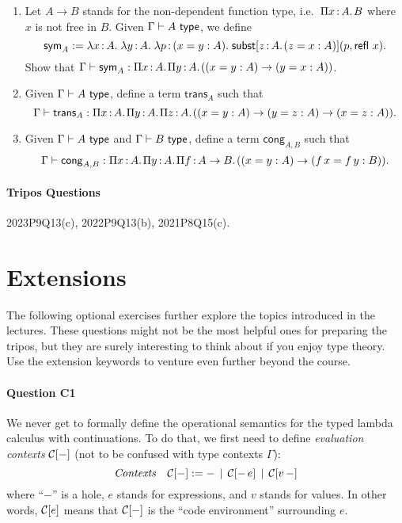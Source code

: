 \documentclass[11pt,a4paper,twoside]{article}
\begin{document}
\begin{enumerate}[label=(\alph*)]
  \item Let $A \to B$ stands for the non-dependent function type, i.e.~$\Pi x \,{:}\, A .\;\! B$ where $x$ is not free in $B$.
  Given $\Gamma \vdash A\ \mathsf{type}$, we define
  \[
    \mathsf{sym}_A := 
    \lambda x \,{:}\, A .\; 
      \lambda y \,{:}\, A .\; 
        \lambda p \,{:}\, (x = y : A) .\; 
          \mathsf{subst}[z \,{:}\, A .\;\! (z = x : A)](p, \mathsf{refl}\ x)
       .
  \]
  Show that $\Gamma \vdash \mathsf{sym}_A : \Pi x \,{:}\, A .\;\! \Pi y \,{:}\, A .\;\! ((x = y : A) \to (y = x : A))$.

  \item Given $\Gamma \vdash A\ \mathsf{type}$, define a term $\mathsf{trans}_A$ such that
  \[
    \Gamma \vdash \mathsf{trans}_A : 
      \Pi x \,{:}\, A .\;\! \Pi y \,{:}\, A .\;\! \Pi z \,{:}\, A .\;\! 
        ((x = y : A) \to (y = z : A) \to (x = z : A))
     .
  \]

  \item Given $\Gamma \vdash A\ \mathsf{type}$ and $\Gamma \vdash B\ \mathsf{type}$, define a term $\mathsf{cong}_{A,B}$ such that
  \[
    \Gamma \vdash \mathsf{cong}_{A, B} : 
      \Pi x \,{:}\, A .\;\! \Pi y \,{:}\, A .\;\! \Pi f \,{:}\, A \to B .\;\! 
        ((x = y : A) \to (f \, x = f \, y : B))
     .
  \]
\end{enumerate}

\paragraph{Tripos Questions} 2023P9Q13(c), 2022P9Q13(b), 2021P8Q15(c).

\section*{Extensions}

The following optional exercises further explore the topics introduced in the lectures. These questions might not be the most helpful ones for preparing the tripos, but they are surely interesting to think about if you enjoy type theory. Use the extension keywords to venture even further beyond the course.

\paragraph{Question C1}
We never get to formally define the operational semantics
for the typed lambda calculus with continuations.
To do that, we first need to define \emph{evaluation contexts} $\mathcal{C}[-]$
 (not to be confused with type contexts $\Gamma$):
\[ 
  \mathit{Contexts}\quad \mathcal{C}[-] := - \,\mid\, \mathcal{C}[- \, e] \,\mid\, \mathcal{C}[v \, -]
\]
where ``$-$'' is a hole, $e$ stands for expressions, and $v$ stands for values.
In other words, $\mathcal{C}[e]$ means that $\mathcal{C}[-]$ is the ``code environment'' surrounding $e$.
\end{document}
